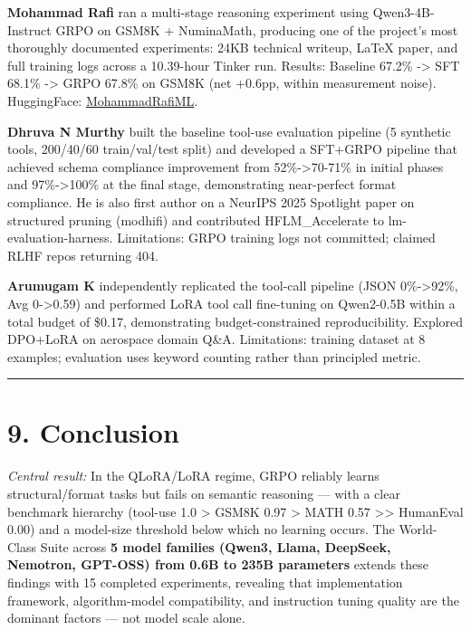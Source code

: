 \documentclass[
  american,
  11pt,
  a4paper,
  oneside]{report}
\begin{document}
\textbf{Mohammad Rafi} ran a multi-stage reasoning experiment using
Qwen3-4B-Instruct GRPO on GSM8K + NuminaMath, producing one of the
project's most thoroughly documented experiments: 24KB technical
writeup, LaTeX paper, and full training logs across a 10.39-hour Tinker
run. Results: Baseline 67.2\% -\textgreater{} SFT 68.1\% -\textgreater{}
GRPO 67.8\% on GSM8K (net +0.6pp, within measurement noise).
HuggingFace:
\href{https://huggingface.co/MohammadRafiML}{MohammadRafiML}.

\textbf{Dhruva N Murthy} built the baseline tool-use evaluation pipeline
(5 synthetic tools, 200/40/60 train/val/test split) and developed a
SFT+GRPO pipeline that achieved schema compliance improvement from
52\%-\textgreater70-71\% in initial phases and 97\%-\textgreater100\% at
the final stage, demonstrating near-perfect format compliance. He is
also first author on a NeurIPS 2025 Spotlight paper on structured
pruning (modhifi) and contributed HFLM\_Accelerate to
lm-evaluation-harness. Limitations: GRPO training logs not committed;
claimed RLHF repos returning 404.

\textbf{Arumugam K} independently replicated the tool-call pipeline
(JSON 0\%-\textgreater92\%, Avg 0-\textgreater0.59) and performed LoRA
tool call fine-tuning on Qwen2-0.5B within a total budget of \$0.17,
demonstrating budget-constrained reproducibility. Explored DPO+LoRA on
aerospace domain Q\&A. Limitations: training dataset at 8 examples;
evaluation uses keyword counting rather than principled metric.

\begin{center}\rule{0.5\linewidth}{0.5pt}\end{center}

\chapter{9. Conclusion}\label{conclusion}

\emph{Central result:} In the QLoRA/LoRA regime, GRPO reliably learns
structural/format tasks but fails on semantic reasoning --- with a clear
benchmark hierarchy (tool-use 1.0 \textgreater{} GSM8K 0.97
\textgreater{} MATH 0.57 \textgreater\textgreater{} HumanEval 0.00) and
a model-size threshold below which no learning occurs. The World-Class
Suite across \textbf{5 model families (Qwen3, Llama, DeepSeek, Nemotron,
GPT-OSS) from 0.6B to 235B parameters} extends these findings with 15
completed experiments, revealing that implementation framework,
algorithm-model compatibility, and instruction tuning quality are the
dominant factors --- not model scale alone.
\end{document}

